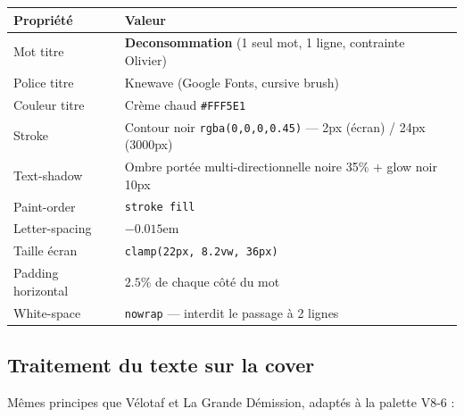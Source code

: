 \documentclass[a4paper,11pt]{article}
\newcommand{\knewave}{\fontspec{Marker Felt}}
\begin{document}
\begin{tcolorbox}[card]
\begin{center}
\end{center}

\vspace{6pt}

\begin{tabularx}{\textwidth}{@{}lX@{}}
\toprule
\textbf{Propriété} & \textbf{Valeur} \\
\midrule
Mot titre & \textbf{Deconsommation} (1 seul mot, 1 ligne, contrainte Olivier) \\
Police titre & Knewave (Google Fonts, cursive brush) \\
Couleur titre & Crème chaud \texttt{\#FFF5E1} \\
Stroke & Contour noir \texttt{rgba(0,0,0,0.45)} — 2px (écran) / 24px (3000px) \\
Text-shadow & Ombre portée multi-directionnelle noire 35\% + glow noir 10px \\
Paint-order & \texttt{stroke fill} \\
Letter-spacing & $-0.015$em \\
Taille écran & \texttt{clamp(22px, 8.2vw, 36px)} \\
Padding horizontal & $2.5$\% de chaque côté du mot \\
White-space & \texttt{nowrap} — interdit le passage à 2 lignes \\
\bottomrule
\end{tabularx}
\end{tcolorbox}

\subsection{Traitement du texte sur la cover}

Mêmes principes que Vélotaf et La Grande Démission, adaptés à la palette V8-6 :
\end{document}

